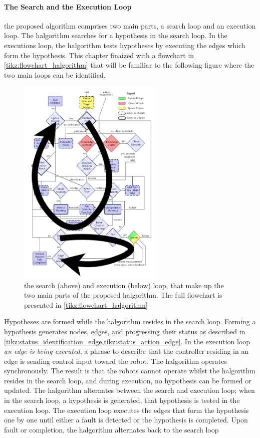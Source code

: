 \paragraph{The Search and the Execution Loop}
the proposed algorithm comprises two main parts, a search loop and an execution loop. The \ac{halgorithm} searches for a hypothesis in the search loop. In the executions loop, the \ac{halgorithm} tests hypotheses by executing the edges which form the hypothesis. This chapter finaized with a flowchart in \cref{tikz:flowchart_halgorithm} that will be familiar to the following figure where the two main loops can be identified.\bs

\begin{figure}[h]
    \centering
    \includegraphics[width=7cm]{figures/proposed_method/two_loops_identified}
    \caption{the search (above) and execution (below) loop, that make up the two main parts of the proposed \ac{halgorithm}. The full flowchart is presented in \cref{tikz:flowchart_halgorithm}}%
    \label{fig:two_loops_identified}
\end{figure}

Hypotheses are formed while the \ac{halgorithm} resides in the search loop. Forming a hypothesis generates nodes, edges, and progressing their status as described in \cref{tikz:status_identification_edge,tikz:status_action_edge}. In the execution loop \textit{an edge is being executed}, a phrase to describe that the controller residing in an edge is sending control input toward the robot. The \ac{halgorithm} operates synchronously. The result is that the robots cannot operate whilst the \ac{halgorithm} resides in the search loop, and during execution, no hypothesis can be formed or updated. The \ac{halgorithm} alternates between the search and execution loop; when in the search loop, a hypothesis is generated, that hypothesis is tested in the execution loop. The execution loop executes the edges that form the hypothesis one by one until either a fault is detected or the hypothesis is completed. Upon fault or completion, the \ac{halgorithm} alternates back to the search loop\bs

